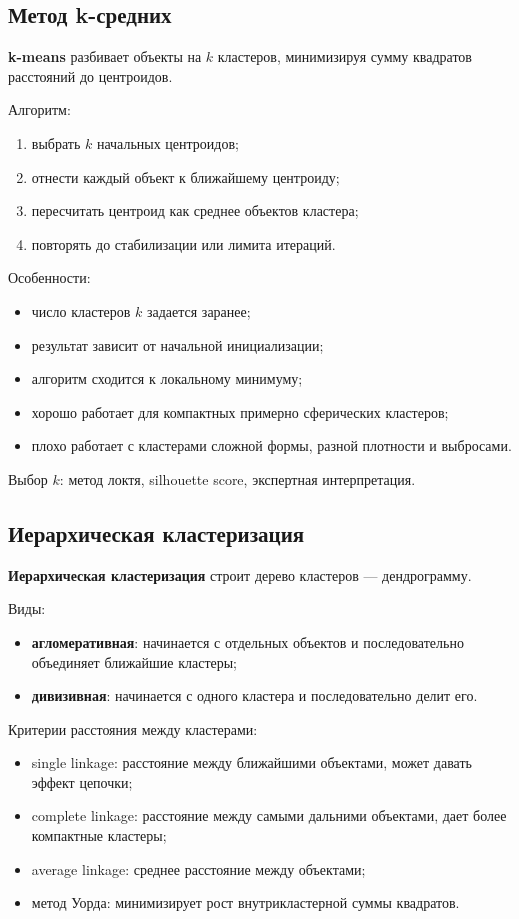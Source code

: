 \subsection*{Метод k-средних}

\textbf{k-means} разбивает объекты на $k$ кластеров, минимизируя сумму квадратов расстояний до центроидов.

Алгоритм:
\begin{enumerate}
    \item выбрать $k$ начальных центроидов;
    \item отнести каждый объект к ближайшему центроиду;
    \item пересчитать центроид как среднее объектов кластера;
    \item повторять до стабилизации или лимита итераций.
\end{enumerate}

Особенности:
\begin{itemize}
    \item число кластеров $k$ задается заранее;
    \item результат зависит от начальной инициализации;
    \item алгоритм сходится к локальному минимуму;
    \item хорошо работает для компактных примерно сферических кластеров;
    \item плохо работает с кластерами сложной формы, разной плотности и выбросами.
\end{itemize}

Выбор $k$: метод локтя, silhouette score, экспертная интерпретация.

\subsection*{Иерархическая кластеризация}

\textbf{Иерархическая кластеризация} строит дерево кластеров --- дендрограмму.

Виды:
\begin{itemize}
    \item \textbf{агломеративная}: начинается с отдельных объектов и последовательно объединяет ближайшие кластеры;
    \item \textbf{дивизивная}: начинается с одного кластера и последовательно делит его.
\end{itemize}

Критерии расстояния между кластерами:
\begin{itemize}
    \item single linkage: расстояние между ближайшими объектами, может давать эффект цепочки;
    \item complete linkage: расстояние между самыми дальними объектами, дает более компактные кластеры;
    \item average linkage: среднее расстояние между объектами;
    \item метод Уорда: минимизирует рост внутрикластерной суммы квадратов.
\end{itemize}

